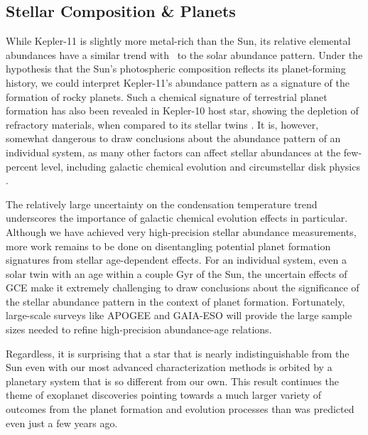 \documentclass[oneside]{emulateapj}
\begin{document}
\subsection{Stellar Composition \& Planets}

While Kepler-11 is slightly more metal-rich than the Sun, its relative elemental abundances have a similar trend with \tc\ to the solar abundance pattern. Under the \citet{Melendez2009} hypothesis that the Sun's photospheric composition reflects its planet-forming history, we could interpret Kepler-11's abundance pattern as a signature of the formation of rocky planets. Such a chemical signature of terrestrial planet formation has also been revealed in Kepler-10 host star, showing the depletion of refractory materials, when compared to its stellar twins \citep{Liu2016}. It is, however, somewhat dangerous to draw conclusions about the abundance pattern of an individual system, as many other factors can affect stellar abundances at the few-percent level, including galactic chemical evolution and circumstellar disk physics \citep{Gaidos2015}.

The relatively large uncertainty on the condensation temperature trend underscores the importance of galactic chemical evolution effects in particular. Although we have achieved very high-precision stellar abundance measurements, more work remains to be done on disentangling potential planet formation signatures from stellar age-dependent effects. For an individual system, even a solar twin with an age within a couple Gyr of the Sun, the uncertain effects of GCE make it extremely challenging to draw conclusions about the significance of the stellar abundance pattern in the context of planet formation. Fortunately, large-scale surveys like APOGEE and GAIA-ESO will provide the large sample sizes needed to refine high-precision abundance-age relations.

Regardless, it is surprising that a star that is nearly indistinguishable from the Sun even with our most advanced characterization methods is orbited by a planetary system that is so different from our own. This result continues the theme of exoplanet discoveries pointing towards a much larger variety of outcomes from the planet formation and evolution processes than was predicted even just a few years ago.
\end{document}
